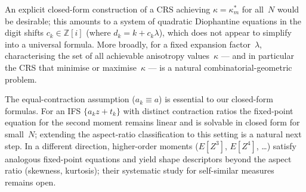 \documentclass{amsart}
\theoremstyle{definition}
\theoremstyle{remark}
\begin{document}
An explicit closed-form construction of a CRS
achieving $\kappa=\kappa_m^*$ for all~$N$ would be desirable;
this amounts to a system of quadratic Diophantine equations
in the digit shifts $c_k\in\mathbb{Z}[i]$
(where $d_k = k + c_k\lambda$), which does not appear to simplify
into a universal formula.
More broadly, for a fixed expansion factor~$\lambda$,
characterising the set of all achievable anisotropy values~$\kappa$
--- and in particular the CRS that minimise or maximise~$\kappa$
--- is a natural combinatorial-geometric problem.

The equal-contraction assumption ($a_k \equiv a$) is essential to our
closed-form formulas.  For an IFS $\{a_k z + t_k\}$ with distinct
contraction ratios the fixed-point equation for the second moment
remains linear and is solvable in closed form for small~$N$;
extending the aspect-ratio classification to this setting is a natural
next step.
In a different direction, higher-order moments ($E[Z^3]$, $E[Z^4]$, \ldots)
satisfy analogous fixed-point equations and yield shape descriptors
beyond the aspect ratio (skewness, kurtosis);
their systematic study for self-similar measures remains open.
\end{document}
